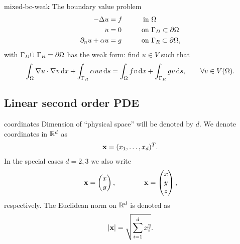 \begin{Lemma}{mixed-bc-weak}
  The boundary value problem
  \begin{gather}
    \begin{aligned}
      -\Delta u &= f &\qquad \text{in } &\Omega\\
      u &= 0 &\text{on } &\Gamma_D \subset \partial\Omega\\
      \partial_n u + \alpha u &= g &\text{on } &\Gamma_R \subset \partial\Omega,
    \end{aligned}
  \end{gather}
  with $\Gamma_D\dot\cup\ \Gamma_R = \partial\Omega$ has the weak form: find $u\in V$ such that
  \begin{gather}
    \int_{\Omega} \nabla u\cdot\nabla v \,\mathrm{d} x
    + \int_{\Gamma_R}\alpha u v \,\mathrm{d} s
    = \int_{\Omega} f v\,\mathrm{d} x
    + \int_{\Gamma_R} g v \,\mathrm{d} s, \qquad\forall v\in V(\Omega).    
  \end{gather}
\end{Lemma}

\subsection{Linear second order PDE}

\begin{Notation}{coordinates}
  Dimension of ``physical space'' will be denoted by $d$.  We denote
  coordinates in $\mathbb R^d$ as
  \begin{gather*}
    \mathbf x = (x_1,\dots,x_d)^T  .
  \end{gather*}
  In the special cases $d=2,3$ we also write
  \begin{gather*}
  \mathbf x =
  \begin{pmatrix}
    x\\y
  \end{pmatrix},
  \qquad\qquad
  \mathbf x = \begin{pmatrix}
    x\\y\\z
  \end{pmatrix},
  \end{gather*}
  respectively.
  The Euclidean norm on $\mathbb R^d$ is denoted as
  \begin{gather*}
     \lvert\mathbf x\rvert = \sqrt{\sum_{i=1}^d x_i^2}.
  \end{gather*}
\end{Notation}

